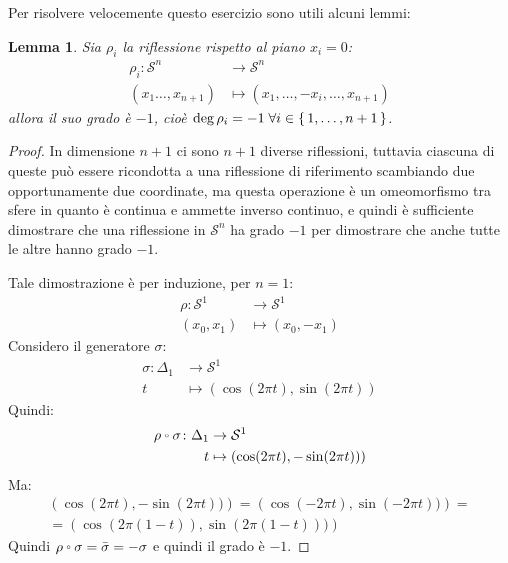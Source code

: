 \documentclass[10pt, toc=sectionentrywithdots]{scrartcl}
\newcounter{lemmac}
\newtheorem{lemma}[lemmac]{Lemma}
\newcommand{\Sph}[1][]{\mathcal{S}^#1}
\let\latexcirc=\circ
\newcommand{\ccirc}{\mathbin{\mathchoice
  {\xcirc\scriptstyle}
  {\xcirc\scriptstyle}
  {\xcirc\scriptscriptstyle}
  {\xcirc\scriptscriptstyle}
}}
\newcommand{\xcirc}[1]{\vcenter{\hbox{$#1\latexcirc$}}}
\let\circ\ccirc
\begin{document}
Per risolvere velocemente questo esercizio sono utili alcuni lemmi:
\begin{lemma}
  Sia $ \rho_i $ la riflessione rispetto al piano $ x_i = 0 $:
  \begin{align*}
    \rho_i \colon \Sph{n} & \to \Sph{n} \\
    (x_1\dots, x_{n+1}) & \mapsto (x_1,\dots,-x_i, \dots, x_{n+1})
  \end{align*}
  allora il suo grado è $ -1 $, cioè $ \deg \rho_i = -1 \; \forall i \in \set{1, \dots, n+1} $.
\end{lemma}
\begin{proof}
  In dimensione $ n + 1 $ ci sono $ n + 1 $ diverse riflessioni, tuttavia
  ciascuna di queste può essere ricondotta a una riflessione di riferimento
  scambiando due opportunamente due coordinate, ma questa operazione è
  un omeomorfismo tra sfere in quanto è continua e ammette inverso continuo,
  e quindi è sufficiente dimostrare che una riflessione in $\Sph{n} $
  ha grado $ - 1 $ per dimostrare che anche tutte le altre hanno grado $ - 1 $.

  Tale dimostrazione è per induzione, per $ n = 1 $:
  \begin{align*}
    \rho \colon \Sph{1} & \to \Sph{1} \\
    (x_0,x_1) & \mapsto (x_0, -x_1)
  \end{align*}
  Considero il generatore $ \sigma $:
  \begin{align*}
    \sigma \colon \Delta_1 & \to \Sph{1} \\
    t & \mapsto \left(\cos(2 \pi t), \sin(2 \pi t)\right)
  \end{align*}
  Quindi:
  \begin{align*}
    \rho \circ \sigma \colon \Delta_1 & \to \Sph{1} \\
    t & \mapsto \left(\cos(2 \pi t), -\sin(2 \pi t))\right)
  \end{align*}
  Ma:
  \begin{gather*}
    \left(\cos(2 \pi t), -\sin(2 \pi t))\right) = \left(\cos(-2 \pi t), \sin(-2 \pi t))\right) = \\
    = \left(\cos(2 \pi (1-t)), \sin(2 \pi (1-t)))\right)
  \end{gather*}
  Quindi $ \rho \circ \sigma = \bar{\sigma} = - \sigma $ e quindi il grado è $ - 1 $.


\end{proof}
\end{document}
